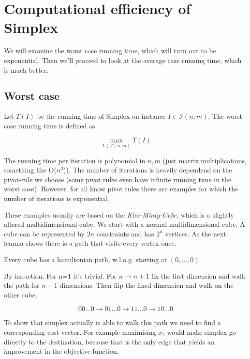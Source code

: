 \section{Computational efficiency of Simplex}

We will examine the worst case running time, which will turn out to be exponential. Then we'll proceed to look at the average case running time, which is much better.

\subsection{Worst case}

\begin{Def} Let $T(I)$ be the running time of Simplex on instance $I\in \mathcal{I}(n,m)$. The worst case running time is defined as

\[\max_{I\in \mathcal{I}(n,m)} T(I)\]
\end{Def}

The running time per iteration is polynomial in $n,m$ (just matrix multiplications, something like O($n^3$)). The number of iterations is heavily dependend on the pivot-rule we choose (some pivot rules even have infinite running time in the worst case). However, for all know pivot rules there are examples for which the number of iterations is exponential.

These examples usually are based on the \emph{Klee-Minty-Cube}, which is a slightly altered multidimensional cube. We start with a normal multidimensional cube. A cube can be represented by $2n$ constraints and has $2^n$ vertices. As the next lemma shows there is a path that visits every vertex once.

\begin{lem} Every cube has a hamiltonian path, w.l.o.g. starting at $(0,\ldots,0)$\end{lem}

\begin{pr} By induction. For n=1 it's trivial. For $n\rightarrow n+1$ fix the first dimension and walk the path for $n-1$ dimensions. Then flip the fixed dimension and walk on the other cube. 

\[00\ldots0 \rightarrow 01\ldots0 \rightarrow 11\ldots 0 \rightarrow 10\ldots0\]
\end{pr}

To show that simplex actually is able to walk this path we need to find a corresponding cost vector. For example maximising $x_1$ would make simplex go directly to the destination, because that is the only edge that yields an improvement in the objective function. 

